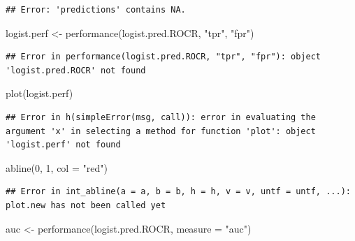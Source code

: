 \documentclass[
  12pt,
]{book}
\newenvironment{Shaded}{\begin{snugshade}}{\end{snugshade}}
\newcommand{\AttributeTok}[1]{\textcolor[rgb]{0.77,0.63,0.00}{#1}}
\newcommand{\DecValTok}[1]{\textcolor[rgb]{0.00,0.00,0.81}{#1}}
\newcommand{\FunctionTok}[1]{\textcolor[rgb]{0.00,0.00,0.00}{#1}}
\newcommand{\NormalTok}[1]{#1}
\newcommand{\OtherTok}[1]{\textcolor[rgb]{0.56,0.35,0.01}{#1}}
\newcommand{\SpecialCharTok}[1]{\textcolor[rgb]{0.00,0.00,0.00}{#1}}
\newcommand{\StringTok}[1]{\textcolor[rgb]{0.31,0.60,0.02}{#1}}
\theoremstyle{definition}
\theoremstyle{definition}
\theoremstyle{definition}
\theoremstyle{definition}
\theoremstyle{remark}
\begin{document}
\begin{Shaded}
\end{Shaded}

\begin{verbatim}
## Error: 'predictions' contains NA.
\end{verbatim}

\begin{Shaded}
\begin{Highlighting}[]
\NormalTok{logist.perf }\OtherTok{\textless{}{-}} \FunctionTok{performance}\NormalTok{(logist.pred.ROCR, }\StringTok{"tpr"}\NormalTok{,}
    \StringTok{"fpr"}\NormalTok{)}
\end{Highlighting}
\end{Shaded}

\begin{verbatim}
## Error in performance(logist.pred.ROCR, "tpr", "fpr"): object 'logist.pred.ROCR' not found
\end{verbatim}

\begin{Shaded}
\begin{Highlighting}[]
\FunctionTok{plot}\NormalTok{(logist.perf)}
\end{Highlighting}
\end{Shaded}

\begin{verbatim}
## Error in h(simpleError(msg, call)): error in evaluating the argument 'x' in selecting a method for function 'plot': object 'logist.perf' not found
\end{verbatim}

\begin{Shaded}
\begin{Highlighting}[]
\FunctionTok{abline}\NormalTok{(}\DecValTok{0}\NormalTok{, }\DecValTok{1}\NormalTok{, }\AttributeTok{col =} \StringTok{"red"}\NormalTok{)}
\end{Highlighting}
\end{Shaded}

\begin{verbatim}
## Error in int_abline(a = a, b = b, h = h, v = v, untf = untf, ...): plot.new has not been called yet
\end{verbatim}

\begin{Shaded}
\begin{Highlighting}[]
\NormalTok{auc }\OtherTok{\textless{}{-}} \FunctionTok{performance}\NormalTok{(logist.pred.ROCR, }\AttributeTok{measure =} \StringTok{"auc"}\NormalTok{)}
\end{Highlighting}
\end{Shaded}
\end{document}
